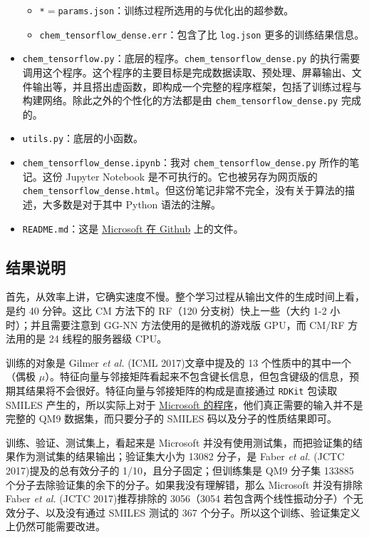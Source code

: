 \documentclass[10pt,a4paper,onecolumn]{article}
\numberwithin{equation}{section}
\begin{document}
\begin{itemize}[noitemsep]
\begin{itemize}[noitemsep, nolistsep]
    \item \verb|*|$ = $\verb|params.json|：训练过程所选用的与优化出的超参数。
    \item \verb|chem_tensorflow_dense.err|：包含了比 \verb|log.json| 更多的训练结果信息。
  \end{itemize}
  \item \verb|chem_tensorflow.py|：底层的程序。\verb|chem_tensorflow_dense.py| 的执行需要调用这个程序。这个程序的主要目标是完成数据读取、预处理、屏幕输出、文件输出等，并且搭出虚函数，即构成一个完整的程序框架，包括了训练过程与构建网络。除此之外的个性化的方法都是由 \verb|chem_tensorflow_dense.py| 完成的。
  \item \verb|utils.py|：底层的小函数。
  \item \verb|chem_tensorflow_dense.ipynb|：我对 \verb|chem_tensorflow_dense.py| 所作的笔记。这份 Jupyter Notebook 是不可执行的。它也被另存为网页版的  \verb|chem_tensorflow_dense.html|。但这份笔记非常不完全，没有关于算法的描述，大多数是对于其中 Python 语法的注解。
  \item \verb|README.md|：这是 \href{https://github.com/Microsoft/gated-graph-neural-network-samples}{Microsoft 在 Github} 上的文件。
\end{itemize}

\subsection{结果说明}

首先，从效率上讲，它确实速度不慢。整个学习过程从输出文件的生成时间上看，是约 40 分钟。这比 CM 方法下的 RF（120 分支树）快上一些（大约 1-2 小时）；并且需要注意到 GG-NN 方法使用的是微机的游戏版 GPU，而 CM/RF 方法用的是 24 线程的服务器级 CPU。

训练的对象是 Gilmer \emph{et al.} (ICML 2017)\citep{Gilmer-Dahl.ICoML.2017.70}文章中提及的 13 个性质中的其中一个（偶极 $ \mu $）。特征向量与邻接矩阵看起来不包含键长信息，但包含键级的信息，预期其结果将不会很好。特征向量与邻接矩阵的构成是直接通过 \verb|RDKit| 包读取 SMILES 产生的，所以实际上对于 \href{https://github.com/Microsoft/gated-graph-neural-network-samples}{Microsoft 的程序}，他们真正需要的输入并不是完整的 QM9 数据集，而只要分子的 SMILES 码以及分子的性质结果即可。

训练、验证、测试集上，看起来是 Microsoft 并没有使用测试集，而把验证集的结果作为测试集的结果输出；验证集大小为 13082 分子，是 Faber \emph{et al.} (JCTC 2017)\citep{Faber-Lilienfeld.JCTC.2017.13}提及的总有效分子的 1/10，且分子固定；但训练集是 QM9 分子集 133885 个分子去除验证集的余下的分子。如果我没有理解错，那么 Microsoft 并没有排除 Faber \emph{et al.} (JCTC 2017)\citep{Faber-Lilienfeld.JCTC.2017.13}推荐排除的 3056（3054 若包含两个线性振动分子）个无效分子、以及没有通过 SMILES 测试的 367 个分子。所以这个训练、验证集定义上仍然可能需要改进。
\end{document}
